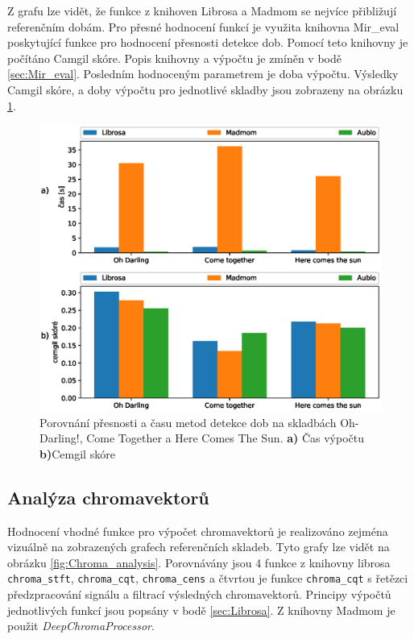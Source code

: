 Z grafu lze vidět, že funkce z knihoven Librosa a Madmom se nejvíce přibližují referenčním dobám. Pro přesné hodnocení funkcí je využita knihovna Mir\_eval poskytující funkce pro hodnocení přesnosti detekce dob. Pomocí teto knihovny je počítáno Camgil skóre. Popis knihovny a výpočtu je zmíněn v bodě \ref{sec:Mir_eval}. Posledním hodnoceným parametrem je doba výpočtu. Výsledky Camgil skóre, a doby výpočtu pro jednotlivé skladby jsou zobrazeny na obrázku \ref{fig:Beat_tracking_time_and_cemgil}.

\begin{figure}[H]
    \centering
    \includegraphics[width = 1\linewidth]{obrazky/Beat_tracking_time_and_cemgil_graphs.eps}
    \caption{Porovnání přesnosti a času metod detekce dob na skladbách Oh-Darling!, Come Together a Here Comes The Sun. \textbf{a)} Čas výpočtu \textbf{b)}Cemgil skóre}
    \label{fig:Beat_tracking_time_and_cemgil}
\end{figure}

\subsection{Analýza chromavektorů}

Hodnocení vhodné funkce pro výpočet chromavektorů je realizováno zejména vizuálně na zobrazených grafech referenčních skladeb. Tyto grafy lze vidět na obrázku \ref{fig:Chroma_analysis}. Porovnávány jsou 4 funkce z knihovny librosa \texttt{chroma\_stft}, \texttt{chroma\_cqt}, \texttt{chroma\_cens} a čtvrtou je funkce \texttt{chroma\_cqt} s řetězci předzpracování signálu a filtrací výsledných chromavektorů. Principy výpočtů jednotlivých funkcí jsou popsány v bodě \ref{sec:Librosa}. Z knihovny Madmom je použit \textit{DeepChromaProcessor}.

